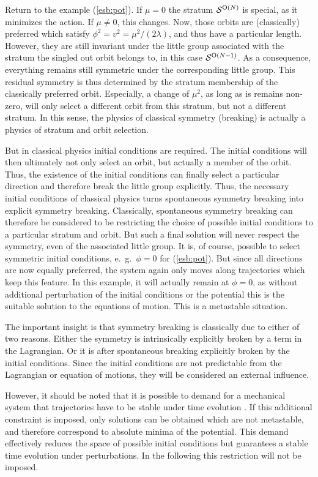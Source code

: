 \documentclass[final,twoside,12pt]{article}
\newcommand*{\pref}[1]{(\ref{#1})}
\newcommand*{\1}{1\!\!\!\bot}
\begin{document}
Return to the example \pref{esb:pot}. If $\mu=0$ the stratum ${\cal S}^{\text{O}(N)}$ is special, as it minimizes the action. If $\mu\neq 0$, this changes. Now, those orbits are (classically) preferred which satisfy $\phi^2=v^2=\mu^2/(2\lambda)$, and thus have a particular length. However, they are still invariant under the little group associated with the stratum the singled out orbit belongs to, in this case ${\cal S}^{\text{O}(N-1)}$. As a consequence, everything remains still symmetric under the corresponding little group. This residual symmetry is thus determined by the stratum membership of the classically preferred orbit. Especially, a change of $\mu^2$, as long as is remains non-zero, will only select a different orbit from this stratum, but not a different stratum. In this sense, the physics of classical symmetry (breaking) is actually a physics of stratum and orbit selection.

But in classical physics initial conditions are required. The initial conditions will then ultimately not only select an orbit, but actually a member of the orbit. Thus, the existence of the initial conditions can finally select a particular direction and therefore break the little group explicitly. Thus, the necessary initial conditions of classical physics turns spontaneous symmetry breaking into explicit symmetry breaking. Classically, spontaneous symmetry breaking can therefore be considered to be restricting the choice of possible initial conditions to a particular stratum and orbit. But such a final solution will never respect the symmetry, even of the associated little group. It is, of course, possible to select symmetric initial conditions, e.\ g.\ $\phi=0$ for \pref{esb:pot}. But since all directions are now equally preferred, the system again only moves along trajectories which keep this feature. In this example, it will actually remain at $\phi=0$, as without additional perturbation of the initial conditions or the potential this is the suitable solution to the equations of motion. This is a metastable situation.

The important insight is that symmetry breaking is classically due to either of two reasons. Either the symmetry is intrinsically explicitly broken by a term in the Lagrangian. Or it is after spontaneous breaking explicitly broken by the initial conditions. Since the initial conditions are not predictable from the Lagrangian or equation of motions, they will be considered an external influence.

However, it should be noted that it is possible to demand for a mechanical system that trajectories have to be stable under time evolution \cite{Strocchi:2005yk,Strocchi:2012ir}. If this additional constraint is imposed, only solutions can be obtained which are not metastable, and therefore correspond to absolute minima of the potential. This demand effectively reduces the space of possible initial conditions but guarantees a stable time evolution under perturbations. In the following this restriction will not be imposed.
\end{document}
